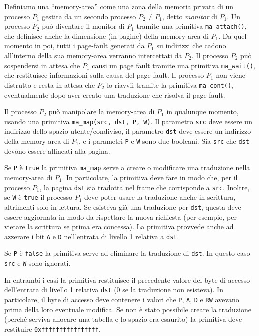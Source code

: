 Definiamo una ``memory-area'' come una zona della memoria privata di un processo $P_1$
gestita da un secondo processo $P_2 \neq P_1$, detto {\em monitor} di $P_1$. Un processo 
$P_2$ pu\`o diventare il monitor di $P_1$ tramite una primitiva \verb|ma_attach()|, che
definisce anche la dimensione (in pagine) della memory-area di $P_1$.
Da quel momento in poi, tutti i page-fault generati da $P_1$ su indirizzi che cadono
all'interno della sua memory-area verranno intercettati da $P_2$. Il processo $P_2$
pu\`o sospendersi in attesa che $P_1$ causi un page fault tramite
una primitiva \verb|ma_wait()|, che restituisce informazioni sulla causa del page
fault. 
Il processo $P_1$ non viene distrutto e resta in attesa che $P_2$ lo riavvii tramite la
primitiva \verb|ma_cont()|, eventualmente dopo aver creato una traduzione che risolva il page fault.

Il processo $P_2$ pu\`o manipolare la memory-area di $P_1$ in qualunque momento, usando una primitiva
\verb|ma_map(src, dst, P, W)|. Il parametro \verb|src|
deve essere un indirizzo dello spazio utente/condiviso, il parametro \verb|dst| deve essere un indirizzo della
memory-area di $P_1$, e i parametri \verb|P| e \verb|W| sono due booleani. Sia \verb|src| che \verb|dst|
devono essere allineati alla pagina.

Se \verb|P| \`e \verb|true| la primitiva \verb|ma_map| serve a creare o modificare una traduzione
nella memory-area di $P_1$.
In particolare, la primitiva deve fare in modo che, per il processo $P_1$, la pagina \verb|dst| 
sia tradotta nel frame che corrisponde a \verb|src|. Inoltre, se \verb|W| \`e \verb|true|
il processo $P_1$ deve poter usare la traduzione anche in scrittura, altrimenti solo in lettura.
Se esisteva già una traduzione per \verb|dst|, questa deve essere aggiornata in modo da rispettare
la nuova richiesta (per esempio, per vietare la scrittura se prima era concessa).
La primitiva provvede anche ad azzerare i bit \verb|A| e \verb|D| nell'entrata di livello 1
relativa a \verb|dst|.

Se \verb|P| \`e \verb|false| la primitiva serve ad eliminare la traduzione di \verb|dst|.
In questo caso \verb|src| e \verb|W| sono ignorati.

In entrambi i casi la primitiva restituisce il precedente valore del byte di accesso dell'entrata di
livello 1 relativa \verb|dst| (0 se la traduzione non esisteva). In particolare,
il byte di accesso deve contenere i valori che \verb|P|, \verb|A|, \verb|D| e \verb|RW| avevano prima della loro
eventuale modifica.
Se non \`e stato possibile creare la traduzione (perch\'e serviva allocare una tabella e lo spazio era
esaurito) la primitiva deve restituire \verb|0xffffffffffffffff|.

